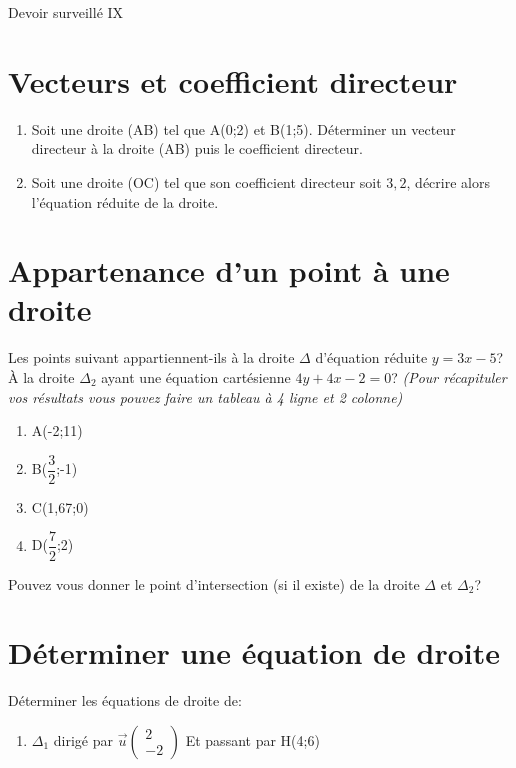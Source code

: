 \documentclass[french]{book}
\begin{document}
\begin{center}
\huge{ Devoir surveillé IX}
\end{center}

\section*{Vecteurs et coefficient directeur}
\begin{enumerate}
\item Soit une droite (AB) tel que A(0;2) et B(1;5). Déterminer un vecteur directeur à la droite (AB) puis le coefficient directeur.
\item Soit une droite (OC) tel que son coefficient directeur soit $3,2$, décrire alors l'équation réduite de la droite.
\end{enumerate}

\section*{Appartenance d'un point à une droite}
Les points suivant appartiennent-ils à la droite $\Delta$ d'équation réduite $y=3x-5$? À la droite $\Delta_2$ ayant une équation cartésienne $4y+4x-2=0$? \textit{ (Pour récapituler vos résultats vous pouvez faire un tableau à 4 ligne et 2 colonne) }

\begin{enumerate}
\item A(-2;11)
\item B($\dfrac{3}{2}$;-1)
\item C(1,67;0)
\item D($\dfrac{7}{2}$;2)
\end{enumerate}

Pouvez vous donner le point d'intersection (si il existe) de la droite $\Delta$ et $\Delta_2$?

\section*{Déterminer une équation de droite}
Déterminer les équations de droite de: 
\begin{enumerate}
\item $\Delta_1$ dirigé par  $\overrightarrow{u} \left( \begin{array}{c} 2 \\ -2 \end{array} \right)$  Et passant par H(4;6)
\end{enumerate}
\end{document}
